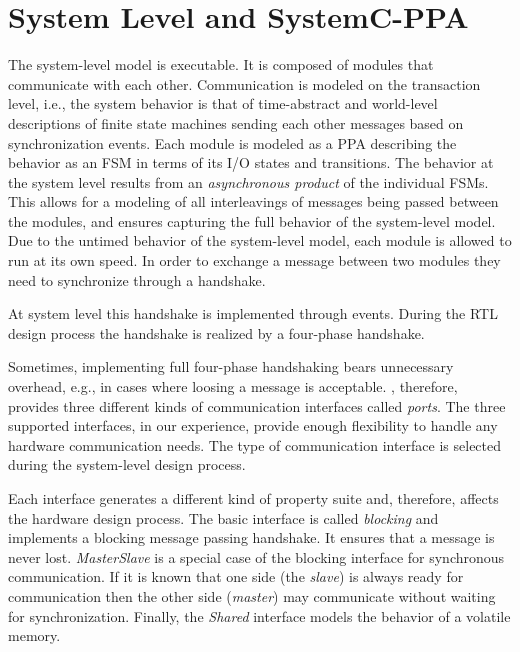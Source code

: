 \section{System Level and SystemC-PPA}
\label{sec:system-level}
The system-level model is executable. %
It is composed of modules that communicate with each other. %
Communication is modeled on the transaction level, i.e., the system
behavior is that of time-abstract and world-level descriptions of
finite state machines sending each other messages based on
synchronization events. %
Each module is modeled as a PPA describing the behavior as an FSM in
terms of its I/O states and transitions. %
The behavior at the system level results from an \emph{asynchronous
  product} of the individual FSMs. %
This allows for a modeling of all interleavings of messages being
passed between the modules, and ensures capturing the full behavior of
the system-level model. %
Due to the untimed behavior of the system-level model, each module is
allowed to run at its own speed. %
In order to exchange a message between two modules they need to
synchronize through a handshake. %

At system level this handshake is implemented through events. %
During the RTL design process the handshake is realized by a
four-phase handshake. %

Sometimes, implementing full four-phase handshaking bears unnecessary
overhead, e.g., in cases where loosing a message is acceptable. %
\SYSTEMCPPA{}, therefore, provides three different kinds of
communication interfaces called \emph{ports}. %
The three supported interfaces, in our experience, provide enough
flexibility to handle any hardware communication needs. %
The type of communication interface is selected during the
system-level design process. %

Each interface generates a different kind of property suite and,
therefore, affects the hardware design process. %
The basic interface is called \textit{blocking} and implements a
blocking message passing handshake. %
It ensures that a message is never lost. %
\textit{MasterSlave} is a special case of the blocking interface for
synchronous communication. %
If it is known that one side (the \emph{slave}) is always ready for
communication then the other side (\emph{master}) may communicate
without waiting for synchronization. %
Finally, the \textit{Shared} interface models the behavior of a
volatile memory. %


